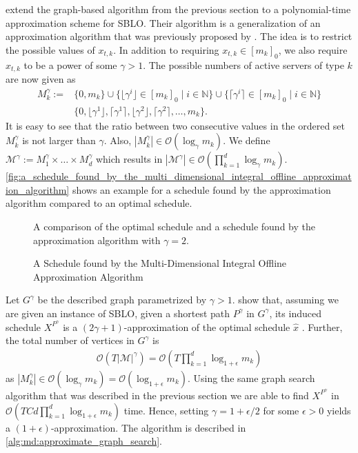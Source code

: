 \citeauthor*{Albers2021_2} extend the graph-based algorithm from the previous section to a polynomial-time approximation scheme \cite{Albers2021_2} for SBLO. Their algorithm is a generalization of an approximation algorithm that was previously proposed by \citeauthor*{Kappelmann2017} \cite{Kappelmann2017}. The idea is to restrict the possible values of $x_{t,k}$. In addition to requiring $x_{t,k} \in [m_k]_0$, we also require $x_{t,k}$ to be a power of some $\gamma > 1$. The possible numbers of active servers of type $k$ are now given as \begin{align*}
    M_k^{\gamma} := &\{0, m_k\} \cup \{\lfloor\gamma^i\rfloor \in [m_k]_0 \mid i \in \mathbb{N}\} \cup \{\lceil\gamma^i\rceil \in [m_k]_0 \mid i \in \mathbb{N}\} \\
                    &\{0, \lfloor\gamma^1\rfloor, \lceil\gamma^1\rceil, \lfloor\gamma^2\rfloor, \lceil\gamma^2\rceil, \dots, m_k\}.
\end{align*} It is easy to see that the ratio between two consecutive values in the ordered set $M_k^{\gamma}$ is not larger than $\gamma$. Also, $|M_k^{\gamma}| \in \mathcal{O}(\log_{\gamma} m_k)$. We define $\mathcal{M}^{\gamma} := M_1^{\gamma} \times \dots \times M_d^{\gamma}$ which results in $|\mathcal{M}^{\gamma}| \in \mathcal{O}(\prod_{k=1}^d \log_{\gamma} m_k)$. \autoref{fig:a_schedule_found_by_the_multi_dimensional_integral_offline_approximation_algorithm} shows an example for a schedule found by the approximation algorithm compared to an optimal schedule.

\begin{figure}
    \centering
    [TODO]

    A comparison of the optimal schedule and a schedule found by the approximation algorithm with $\gamma = 2$.
    \caption{A Schedule found by the Multi-Dimensional Integral Offline Approximation Algorithm}
    \label{fig:a_schedule_found_by_the_multi_dimensional_integral_offline_approximation_algorithm}
\end{figure}

Let $G^{\gamma}$ be the described graph parametrized by $\gamma > 1$. \citeauthor*{Albers2021_2} show that, assuming we are given an instance of SBLO, given a shortest path $P^{\gamma}$ in $G^{\gamma}$, its induced schedule $X^{P^{\gamma}}$ is a $(2\gamma + 1)$-approximation of the optimal schedule $\hat{x}$ \cite{Albers2021_2}. Further, the total number of vertices in $G^{\gamma}$ is \begin{align*}
    \mathcal{O}(T |\mathcal{M}|^{\gamma}) = \mathcal{O}(T \prod_{k=1}^d \log_{1+\epsilon} m_k)
\end{align*} as $|M_k^{\gamma}| \in \mathcal{O}(\log_{\gamma} m_k) = \mathcal{O}(\log_{1 + \epsilon} m_k)$. Using the same graph search algorithm that was described in the previous section we are able to find $X^{P^{\gamma}}$ in $\mathcal{O}(T C d \prod_{k=1}^d \log_{1 + \epsilon} m_k)$ time. Hence, setting $\gamma = 1 + \epsilon / 2$ for some $\epsilon > 0$ yields a $(1+\epsilon)$-approximation. The algorithm is described in \autoref{alg:md:approximate_graph_search}.

